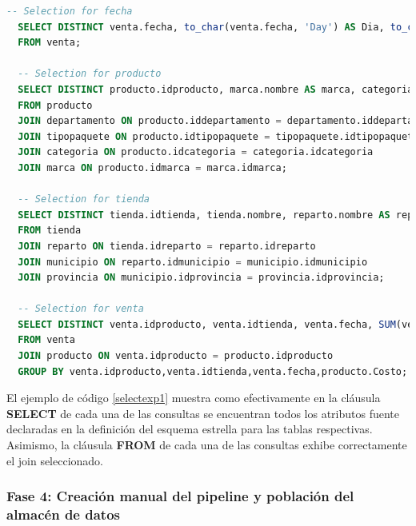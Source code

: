 \begin{lstlisting}[label={selectexp1}, caption={Consultas de selecci\'on generadas para el experimento 1}, language={sql}]
  -- Selection for fecha
  SELECT DISTINCT venta.fecha, to_char(venta.fecha, 'Day') AS Dia, to_char(venta.fecha, 'Month') AS Mes
  FROM venta;

  -- Selection for producto
  SELECT DISTINCT producto.idproducto, marca.nombre AS marca, categoria.nombre AS categoria, tipopaquete.nombre AS paquete, departamento.nombre AS departamento, departamento.descripcion AS descripcion, producto.nombre AS producto, producto.precio, producto.costo
  FROM producto
  JOIN departamento ON producto.iddepartamento = departamento.iddepartamento
  JOIN tipopaquete ON producto.idtipopaquete = tipopaquete.idtipopaquete
  JOIN categoria ON producto.idcategoria = categoria.idcategoria
  JOIN marca ON producto.idmarca = marca.idmarca;

  -- Selection for tienda
  SELECT DISTINCT tienda.idtienda, tienda.nombre, reparto.nombre AS reparto, municipio.nombre AS municipio, provincia.nombre AS provincia
  FROM tienda
  JOIN reparto ON tienda.idreparto = reparto.idreparto
  JOIN municipio ON reparto.idmunicipio = municipio.idmunicipio
  JOIN provincia ON municipio.idprovincia = provincia.idprovincia;

  -- Selection for venta
  SELECT DISTINCT venta.idproducto, venta.idtienda, venta.fecha, SUM(venta.cantidad_vendida) AS cantidad_vendida_total, SUM(venta.pago) AS importe_total, producto.Costo*SUM(venta.cantidad_vendida) AS coste_total, SUM(venta.pago)-producto.Costo*SUM(venta.cantidad_vendida) AS ganancia
  FROM venta
  JOIN producto ON venta.idproducto = producto.idproducto
  GROUP BY venta.idproducto,venta.idtienda,venta.fecha,producto.Costo;
\end{lstlisting}

El ejemplo de c\'odigo \ref{selectexp1} muestra como efectivamente en la cl\'ausula \textbf{SELECT} 
de cada una de las consultas se encuentran todos los atributos fuente declaradas en la definición 
del esquema estrella para las tablas respectivas. Asimismo, la cl\'ausula \textbf{FROM} de cada 
una de las consultas exhibe correctamente  el join seleccionado.

\subsubsection{Fase 4: Creaci\'on manual del pipeline y poblaci\'on del almac\'en de datos}

